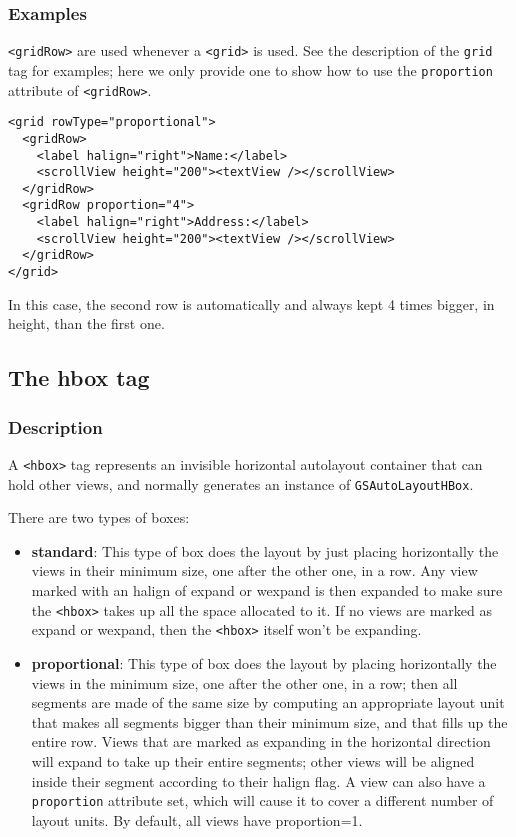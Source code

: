 \subsubsection{Examples}
\texttt{<gridRow>} are used whenever a \texttt{<grid>} is used.  See
the description of the \texttt{grid} tag for examples; here we only
provide one to show how to use the \texttt{proportion} attribute of
\texttt{<gridRow>}.
\begin{verbatim}
<grid rowType="proportional">
  <gridRow>
    <label halign="right">Name:</label>
    <scrollView height="200"><textView /></scrollView>
  </gridRow>
  <gridRow proportion="4">
    <label halign="right">Address:</label>
    <scrollView height="200"><textView /></scrollView>
  </gridRow>
</grid>
\end{verbatim}
In this case, the second row is automatically and always kept 4 times
bigger, in height, than the first one.

\subsection{The hbox tag}

\subsubsection{Description}
A \texttt{<hbox>} tag represents an invisible horizontal autolayout
container that can hold other views, and normally generates an
instance of \texttt{GSAutoLayoutHBox}.

There are two types of boxes:
\begin{itemize}
\item {\bf standard}: This type of box does the layout by just placing
  horizontally the views in their minimum size, one after the other
  one, in a row.  Any view marked with an halign of expand or wexpand
  is then expanded to make sure the \texttt{<hbox>} takes up all the
  space allocated to it.  If no views are marked as expand or wexpand,
  then the \texttt{<hbox>} itself won't be expanding.
\item {\bf proportional}: This type of box does the layout by placing
  horizontally the views in the minimum size, one after the other one,
  in a row; then all segments are made of the same size by computing
  an appropriate layout unit that makes all segments bigger than their
  minimum size, and that fills up the entire row.  Views that are
  marked as expanding in the horizontal direction will expand to take
  up their entire segments; other views will be aligned inside their
  segment according to their halign flag.  A view can also have a
  \texttt{proportion} attribute set, which will cause it to cover a
  different number of layout units.  By default, all views have
  proportion=1.
\end{itemize}

